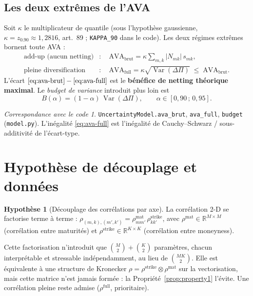 \documentclass[11pt,a4paper]{article}
\newcommand{\code}[1]{\texttt{#1}}
\DeclareMathOperator{\Var}{Var}
\newcommand{\R}{\mathbb{R}}
\newcommand{\dPi}{\Delta\Pi}
\newcommand{\abs}[1]{\left| #1 \right|}
\theoremstyle{plain}
\theoremstyle{definition}
\newtheorem{hypothese}[theoreme]{Hypothèse}
\theoremstyle{remark}
\newtheorem*{impl}{Correspondance avec le code}
\begin{document}
\subsection{Les deux extrêmes de l'AVA}
Soit $\kappa$ le multiplicateur de quantile (sous l'hypothèse gaussienne,
$\kappa = z_{0.90} \approx 1{,}2816$, art.~89 ; \code{KAPPA\_90} dans le code). Les
deux régimes extrêmes bornent toute AVA :
\begin{align}
\text{add-up (aucun netting)} &:\quad
\mathrm{AVA}_{\mathrm{brut}} = \kappa \sum_{m,k} \abs{N_{mk}}\, s_{mk},
\label{eq:ava-brut}\\[2pt]
\text{pleine diversification} &:\quad
\mathrm{AVA}_{\mathrm{full}} = \kappa \sqrt{\Var(\dPi)}
\;\le\; \mathrm{AVA}_{\mathrm{brut}}.
\label{eq:ava-full}
\end{align}
L'écart $\eqref{eq:ava-brut}-\eqref{eq:ava-full}$ est le \textbf{bénéfice de netting
théorique maximal}. Le \emph{budget de variance} introduit plus loin est
\begin{equation}
B(\alpha) = (1-\alpha)\,\Var(\dPi), \qquad \alpha \in [0{,}90\,;\,0{,}95].
\label{eq:budget}
\end{equation}

\begin{impl}
\code{UncertaintyModel.ava\_brut}, \code{ava\_full}, \code{budget}
(\code{model.py}). L'inégalité \eqref{eq:ava-full} est l'inégalité de
Cauchy--Schwarz / sous-additivité de l'écart-type.
\end{impl}

\section{Hypothèse de découplage et données}\label{sec:decouple-hyp}

\begin{hypothese}[Découplage des corrélations par axe]\label{hyp:decouple}
La corrélation 2-D se factorise terme à terme :
$\rho_{(m,k),(m',k')} = \rho^{\mathrm{mat}}_{mm'}\,\rho^{\mathrm{strike}}_{kk'}$, avec
$\rho^{\mathrm{mat}}\in\R^{M\times M}$ (corrélation entre maturités) et
$\rho^{\mathrm{strike}}\in\R^{K\times K}$ (corrélation entre moneyness).
\end{hypothese}

Cette factorisation n'introduit que $\binom{M}{2} + \binom{K}{2}$ paramètres, chacun
interprétable et stressable indépendamment, au lieu de $\binom{MK}{2}$. Elle est
équivalente à une structure de Kronecker $\rho = \rho^{\mathrm{strike}} \otimes
\rho^{\mathrm{mat}}$ sur la vectorisation, mais cette matrice n'est jamais formée :
la Propriété~\ref{prop:property1} l'évite. Une corrélation pleine reste admise
($\rho^{\mathrm{full}}$, prioritaire).
\end{document}

